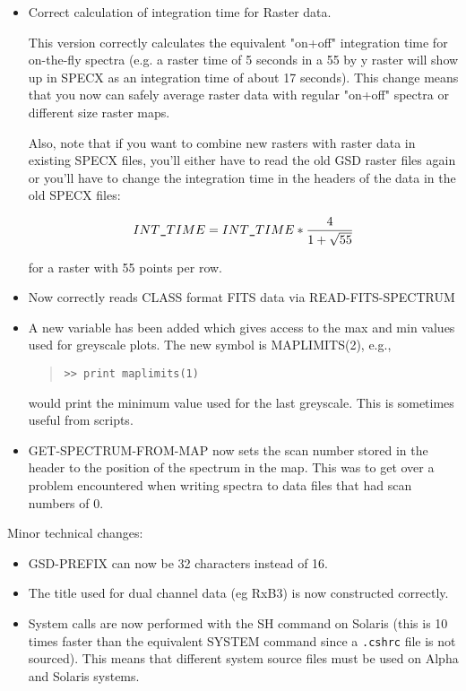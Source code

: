 \documentclass[twoside,11pt]{article}
\renewcommand{\_}{\texttt{\symbol{95}}}
\newenvironment{myquote}{\begin{quote}\begin{small}}{\end{small}\end{quote}}
\begin{document}
\begin{itemize}
\item Correct calculation of integration time for Raster data.

     This version correctly calculates the equivalent "on+off"
     integration time for on-the-fly spectra (e.g. a raster time of 5
     seconds in a 55 by y raster will show up in SPECX as an
     integration time of about 17 seconds). This change means that you
     now can safely average raster data with regular "on+off" spectra
     or different size raster maps.

     Also, note that if you want to combine new rasters with raster
     data in existing SPECX files, you'll either have to read the old
     GSD raster files again or you'll have to change the integration
     time in the headers of the data in the old SPECX files:

\[
         INT\_TIME = INT\_TIME * \frac{4}{1+\sqrt{55}}
\]

     for a raster with 55 points per row.

\item Now correctly reads CLASS format FITS data via READ-FITS-SPECTRUM

\item A new variable has been added which gives access to the max and min
     values used for greyscale plots. The new symbol is MAPLIMITS(2), e.g.,
\begin{myquote}
\begin{verbatim}
>> print maplimits(1)
\end{verbatim}
\end{myquote}

   would print the minimum value used for the last greyscale.
     This is sometimes useful from scripts.

\item GET-SPECTRUM-FROM-MAP now sets the scan number stored in the header
     to the position of the spectrum in the map. This was to get over
     a problem encountered when writing spectra to data files that had
     scan numbers of 0.

\end{itemize}

Minor technical changes:

\begin{itemize}

\item GSD-PREFIX can now be 32 characters instead of 16.

\item The title used for dual channel data (eg RxB3) is now constructed
      correctly.

\item System calls are now performed with the SH command on Solaris
      (this is 10 times faster than the equivalent SYSTEM command
      since a \texttt{.cshrc} file is not sourced).  This means that different
      system source files must be used on Alpha and Solaris systems.

\end{itemize}
\end{document}
